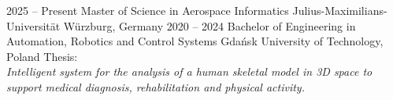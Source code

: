 \documentclass[9pt]{./src/packages/Developer_CV/developercv}
\begin{document}


\begin{entrylist}
    \entry
        {2025 -- Present}
        {Master of Science in Aerospace Informatics}
        {Julius-Maximilians-Universität Würzburg, Germany}
        {
        }
    \entry
        {2020 -- 2024}
        {Bachelor of Engineering in Automation, Robotics and Control Systems}
        {Gdańsk University of Technology, Poland}
        {
        Thesis:\\[0.1em]
        \textit{
        Intelligent system for the analysis of a human skeletal model
        in 3D space to support medical diagnosis, rehabilitation and physical
        activity.}
        }
\end{entrylist}


\end{document}
